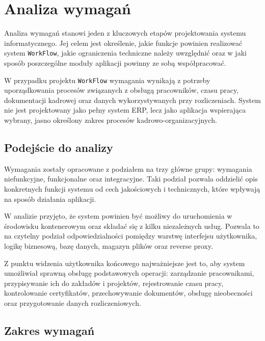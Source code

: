 \section{Analiza wymagań}

Analiza wymagań stanowi jeden z kluczowych etapów projektowania systemu informatycznego. Jej celem jest określenie, jakie funkcje powinien realizować system \texttt{WorkFlow}, jakie ograniczenia techniczne należy uwzględnić oraz w jaki sposób poszczególne moduły aplikacji powinny ze sobą współpracować.

W przypadku projektu \texttt{WorkFlow} wymagania wynikają z potrzeby uporządkowania procesów związanych z obsługą pracowników, czasu pracy, dokumentacji kadrowej oraz danych wykorzystywanych przy rozliczeniach. System nie jest projektowany jako pełny system ERP, lecz jako aplikacja wspierająca wybrany, jasno określony zakres procesów kadrowo-organizacyjnych.

\subsection{Podejście do analizy}

Wymagania zostały opracowane z podziałem na trzy główne grupy: wymagania niefunkcyjne, funkcjonalne oraz integracyjne. Taki podział pozwala oddzielić opis konkretnych funkcji systemu od cech jakościowych i technicznych, które wpływają na sposób działania aplikacji.

W analizie przyjęto, że system powinien być możliwy do uruchomienia w środowisku kontenerowym oraz składać się z kilku niezależnych usług. Pozwala to na czytelny podział odpowiedzialności pomiędzy warstwę interfejsu użytkownika, logikę biznesową, bazę danych, magazyn plików oraz reverse proxy.

Z punktu widzenia użytkownika końcowego najważniejsze jest to, aby system umożliwiał sprawną obsługę podstawowych operacji: zarządzanie pracownikami, przypisywanie ich do zakładów i projektów, rejestrowanie czasu pracy, kontrolowanie certyfikatów, przechowywanie dokumentów, obsługę nieobecności oraz przygotowanie danych rozliczeniowych.

\subsection{Zakres wymagań}

